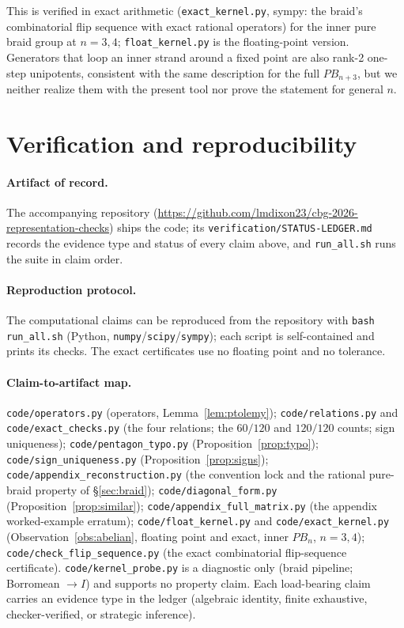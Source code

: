 \documentclass[11pt]{article}
\theoremstyle{plain}
\theoremstyle{definition}
\theoremstyle{remark}
\begin{document}
This is verified in exact arithmetic (\texttt{exact\_kernel.py}, sympy: the braid's combinatorial flip
sequence with exact rational operators) for the inner pure braid group at $n=3,4$; \texttt{float\_kernel.py}
is the floating-point version. Generators that loop an inner strand around a fixed point are also rank-2
one-step unipotents, consistent with the same description for the full $PB_{n+3}$, but we neither
realize them with the present tool nor prove the statement for general $n$.

\section{Verification and reproducibility}\label{sec:repro}

\paragraph{Artifact of record.} The accompanying repository
(\url{https://github.com/lmdixon23/cbg-2026-representation-checks}) ships the code; its
\texttt{verification/STATUS-LEDGER.md} records the evidence type and status of every claim above, and
\texttt{run\_all.sh} runs the suite in claim order.

\paragraph{Reproduction protocol.} The computational claims can be reproduced from the repository with
\texttt{bash run\_all.sh} (Python, \texttt{numpy}/\texttt{scipy}/\texttt{sympy}); each script is
self-contained and prints its checks. The exact certificates use no floating point and no tolerance.

\paragraph{Claim-to-artifact map.} \texttt{code/operators.py} (operators, Lemma~\ref{lem:ptolemy});
\texttt{code/relations.py} and \texttt{code/exact\_checks.py} (the four relations; the $60/120$ and
$120/120$ counts; sign uniqueness); \texttt{code/pentagon\_typo.py} (Proposition~\ref{prop:typo});
\texttt{code/sign\_uniqueness.py} (Proposition~\ref{prop:signs});
\texttt{code/appendix\_reconstruction.py} (the convention lock and the rational pure-braid property of
\S\ref{sec:braid}); \texttt{code/diagonal\_form.py} (Proposition~\ref{prop:similar});
\texttt{code/appendix\_full\_matrix.py} (the appendix worked-example erratum); \texttt{code/float\_kernel.py}
and \texttt{code/exact\_kernel.py} (Observation~\ref{obs:abelian}, floating point and exact, inner $PB_n$,
$n=3,4$); \texttt{code/check\_flip\_sequence.py} (the exact combinatorial flip-sequence certificate).
\texttt{code/kernel\_probe.py} is a diagnostic only (braid pipeline; Borromean $\to I$) and supports no
property claim. Each load-bearing claim carries an evidence type in the ledger (algebraic identity, finite
exhaustive, checker-verified, or strategic inference).
\end{document}
